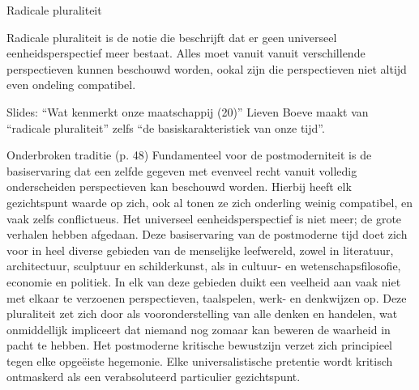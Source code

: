 \documentclass[main.tex]{subfiles}
\begin{document}
\begin{examenvraag}
    \begin{vraag}
        Radicale pluraliteit
    \end{vraag}

    \begin{antwoord}
        Radicale pluraliteit is de notie die beschrijft dat er geen universeel eenheidsperspectief meer bestaat.
        Alles moet vanuit vanuit verschillende perspectieven kunnen beschouwd worden, ookal zijn die perspectieven niet altijd even ondeling compatibel.
        \begin{citaat}{Slides: ``Wat kenmerkt onze maatschappij (20)''}
            Lieven Boeve maakt van “radicale pluraliteit” zelfs “de basiskarakteristiek van onze tijd”.
        \end{citaat}
        \begin{citaat}{Onderbroken traditie (p. 48)}
            Fundamenteel voor de postmoderniteit is de basiservaring dat een zelfde gegeven met evenveel recht vanuit volledig onderscheiden perspectieven kan beschouwd worden.
            Hierbij heeft elk gezichtspunt waarde op zich, ook al tonen ze zich onderling weinig compatibel, en vaak zelfs conflictueus.
            Het universeel eenheidsperspectief is niet meer; de grote verhalen hebben afgedaan.
            Deze basiservaring van de postmoderne tijd doet zich voor in heel diverse gebieden van de menselijke leefwereld, zowel in literatuur, architectuur, sculptuur en schilderkunst, als in cultuur- en wetenschapsfilosofie, economie en politiek.
            In elk van deze gebieden duikt een veelheid aan vaak niet met elkaar te verzoenen perspectieven, taalspelen, werk- en denkwijzen op.
            Deze pluraliteit zet zich door als vooronderstelling van alle denken en handelen, wat onmiddellijk impliceert dat niemand nog zomaar kan beweren de waarheid in pacht te hebben.
            Het postmoderne kritische bewustzijn verzet zich principieel tegen elke opgeëiste hegemonie.
            Elke universalistische pretentie wordt kritisch ontmaskerd als een verabsoluteerd particulier gezichtspunt.
        \end{citaat}
    \end{antwoord}
\end{examenvraag}
\end{document}
